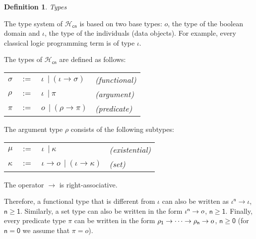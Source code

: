 \documentclass[inscr,ack,preface]{dithesis}
\theoremstyle{definition}
\newtheorem{definition}{Definition}[]
\newcommand{\hcn}{$\mathcal{H}_\mathsf{cn}$}
\newcommand{\msf}[1]{$\mathsf{#1}$}
\begin{document}
\begin{definition}{\emph{Types}}

The type system of \hcn{} is based on two base types: $o$, the type of the boolean domain and $\iota$, the type of the individuals (data objects). For example, every classical logic programming term is of type $\iota$.

The types of \hcn{} are defined as follows:

\begin{center}
  \begin{tabular}{llll}
    $\sigma$ & $:=$ & $\iota ~~|~ \left( \iota \rightarrow \sigma \right)$ & \hspace*{2.5cm} \emph{(functional)} \\
    $\rho$   & $:=$ & $\iota ~~|~ \pi$ & \hspace*{2.5cm} \emph{(argument)} \\
    $\pi$    & $:=$ & $o ~~|~ \left( \rho \rightarrow \pi \right)$ & \hspace*{2.5cm} \emph{(predicate)} \\
  \end{tabular}
\end{center}

The argument type $\rho$ consists of the following subtypes:

\begin{center}
  \begin{tabular}{llll}
    $\mu$    & $:=$ & $\iota ~~|~ \kappa$ & \hspace*{2.5cm} \emph{(existential)} \\
    $\kappa$ & $:=$ & $\iota \rightarrow o ~~|~ \left( \iota \rightarrow \kappa \right)$ & \hspace*{2.5cm} \emph{(set)} \\
  \end{tabular}
\end{center}
\end{definition}

The operator \msf{\rightarrow} is right-associative.

Therefore, a functional type that is different from \msf{\iota} can also be written as \msf{\iota^n \rightarrow \iota}, \msf{n \ge 1}.
Similarly, a set type can also be written in the form \msf{\iota^n \rightarrow \mathnormal{o}}, \msf{n \ge 1}.
Finally, every predicate type $\pi$ can be written in the form \msf{\mathnormal{\rho}_1 \rightarrow \dots \rightarrow \mathnormal{\rho}_n \rightarrow \mathnormal{o}}, \msf{n \ge 0} (for \msf{n = 0} we assume that $\pi = o$).
\end{document}
